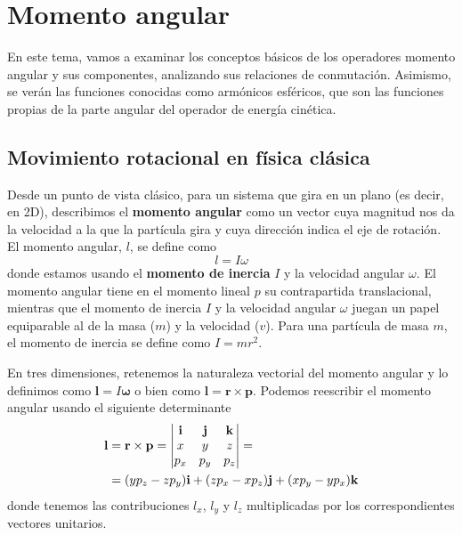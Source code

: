 \chapter{Momento angular}
En este tema, vamos a examinar los conceptos básicos de los
operadores momento angular y sus componentes, analizando sus
relaciones de conmutación. Asimismo, se verán las funciones
conocidas como armónicos esféricos, que son las funciones
propias de la parte angular del operador de energía cinética.

\section{Movimiento rotacional en física clásica}
Desde un punto de vista clásico, para un sistema que gira 
en un plano (es decir, en 2D), describimos el \textbf{momento
angular} como un vector cuya magnitud nos da la velocidad 
a la que la partícula gira y cuya dirección indica el eje
de rotación. El momento angular, $l$, se define como
\begin{equation}
    l=I\omega
\end{equation}
donde estamos usando el \textbf{momento de inercia} $I$ y
la velocidad angular $\omega$. El momento angular tiene 
en el momento lineal $p$ su contrapartida translacional, mientras que el momento de inercia $I$ y la velocidad
angular $\omega$ juegan un papel equiparable al de la masa
($m$) y la velocidad ($v$). Para una partícula de masa $m$, 
el momento de inercia se define como $I=mr^2$.


En tres dimensiones, retenemos la naturaleza vectorial
del momento angular y lo definimos como 
$\mathbf{l}= I\bm{\omega}$
o bien como $\mathbf{l} = \mathbf{r}\times\mathbf{p}$.
Podemos reescribir el momento angular usando el siguiente
determinante
\begin{align}
    \mathbf{l}&=\mathbf{r}\times\mathbf{p} =
    \begin{vmatrix}
\mathbf{i} & \mathbf{j} & \mathbf{k}  \\ 
x & y & z \\ 
p_x & p_y & p_z  \notag
\end{vmatrix} = \\
&= (yp_z-zp_y)\mathbf{i} +
(zp_x-xp_z)\mathbf{j} +
(xp_y-yp_x)\mathbf{k}
\end{align}
donde tenemos las contribuciones $l_x$, $l_y$ y $l_z$
multiplicadas por los correspondientes vectores unitarios.

